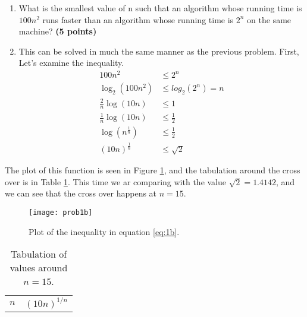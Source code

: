 \documentclass{article}
\begin{document}
\begin{enumerate}[label=(\alph*)]
\item  What is the smallest value of n such that an algorithm whose
running time is $100n^2$ runs faster than an algorithm whose running
time is $2^n$ on the same machine? {\bf (5 points) }
\item[] This can be solved in much the same manner as the previous
  problem. First, Let's examine the inequality.
  \begin{equation}\label{eq:1b}
    \begin{split}
      100 n^2 & \le 2^n\\
      \log_2(100n^2) & \le log_2(2^n) = n\\
      \frac{2}{n} \log(10n) &\le 1\\
      \frac{1}{n} \log(10n) &\le \frac1 2\\
      \log\left(n^{\frac{1}{n}}\right) &\le \frac{1}{2}\\
      \left(10n\right)^{\frac{1}{n}} &\le \sqrt{2}
    \end{split}
  \end{equation}
\end{enumerate} 

The plot of this function is seen in Figure \ref{fig:1b}, and the
tabulation around the cross over is in Table \ref{tab:1b}.  This time
we ar comparing with the value $\sqrt{2} = 1.4142$, and we can see
that the cross over happens at $n=15$.
\begin{figure}[h!]
  \centering
  \texttt{[image: prob1b]}
  \caption{Plot of the inequality in equation \ref{eq:1b}.}
  \label{fig:1b}
\end{figure}

\begin{table}[h!]
  \centering
  \caption{Tabulation of values around $n=15$.}
  \label{tab:1b}
  \begin{tabular}[h]{cc}
    $n$ & $(10n)^{1/n}$ \\
    
  \end{tabular}
\end{table}
\end{document}
